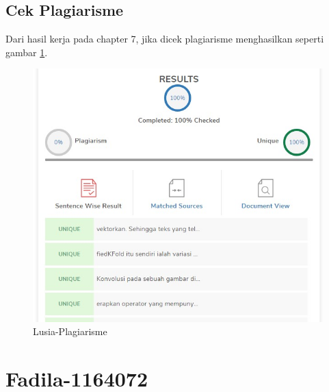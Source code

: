 \subsection{Cek Plagiarisme}
\par Dari hasil kerja pada chapter 7, jika dicek plagiarisme menghasilkan seperti gambar \ref{7D1}.
		\begin{figure}[!hbtp]
		\centering
		\includegraphics[scale=0.4]{figures/pc7.jpg}
		\caption{Lusia-Plagiarisme}
		\label{7D1}
		\end{figure}



\par
\par
\par
\par
\section{Fadila-1164072}
